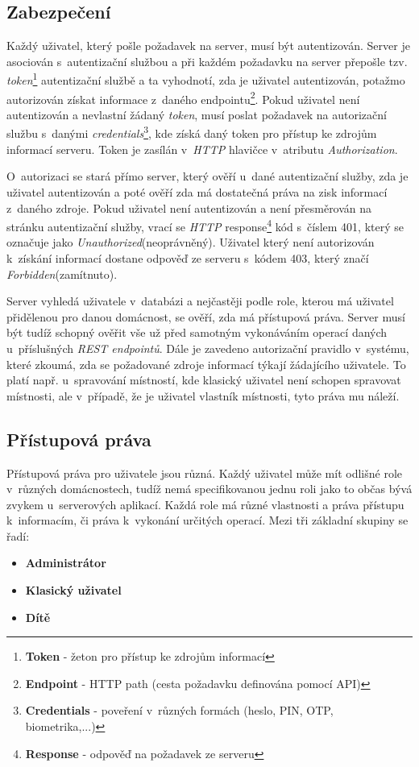 \subsection*{Zabezpečení}
\label{backend:bezpecnost}
Každý uživatel, který pošle požadavek na server, musí být autentizován.
Server je asociován s~autentizační službou a při každém požadavku na server přepošle tzv. \emph{token}\footnote{\textbf{Token} - žeton pro přístup ke zdrojům informací} autentizační službě
a ta vyhodnotí, zda je uživatel autentizován, potažmo autorizován získat informace z~daného endpointu\footnote{\textbf{Endpoint} - HTTP path (cesta požadavku definována pomocí API)}.
Pokud uživatel není autentizován a nevlastní žádaný \emph{token}, musí poslat požadavek na autorizační službu s~danými \emph{credentials}\footnote{\textbf{Credentials} - poveření v~různých formách (heslo, PIN, OTP, biometrika,...)},
kde získá daný token pro přístup ke zdrojům informací serveru. Token je zasílán v~\emph{HTTP} hlavičce v~atributu \emph{Authorization}.

O~autorizaci se stará přímo server, který ověří u~dané autentizační služby, zda je uživatel autentizován a poté ověří zda má dostatečná práva na zisk informací z~daného zdroje.
Pokud uživatel není autentizován a není přesměrován na stránku autentizační služby, vrací se \emph{HTTP} response\footnote{\textbf{Response} - odpověď na požadavek ze serveru} kód s~číslem 401, který se označuje jako \emph{Unauthorized}(neoprávněný).
Uživatel který není autorizován k~získání informací dostane odpověď ze serveru s~kódem 403, který značí \emph{Forbidden}(zamítnuto).

Server vyhledá uživatele v~databázi a nejčastěji podle role, kterou má uživatel přidělenou pro danou domácnost, se ověří, zda má přístupová práva.
Server musí být tudíž schopný ověřit vše už před samotným vykonáváním operací daných u~příslušných \emph{REST endpointů}.
Dále je zavedeno autorizační pravidlo v~systému, které zkoumá, zda se požadované zdroje informací týkají žádajícího uživatele.
To platí např. u~spravování místností, kde klasický uživatel není schopen spravovat místnosti, ale v~případě, že je uživatel vlastník místnosti, tyto práva mu náleží.

\subsection*{Přístupová práva}
\label{backend:prava}
Přístupová práva pro uživatele jsou různá. Každý uživatel může mít odlišné role v~různých domácnostech, tudíž nemá specifikovanou jednu roli jako to občas bývá zvykem u~serverových aplikací.
Každá role má různé vlastnosti a práva přístupu k~informacím, či práva k~vykonání určitých operací.
\newline
Mezi tři základní skupiny se řadí:
\begin{itemize}
  \item \textbf{Administrátor}
  \item \textbf{Klasický uživatel}
  \item \textbf{Dítě}
\end{itemize}

